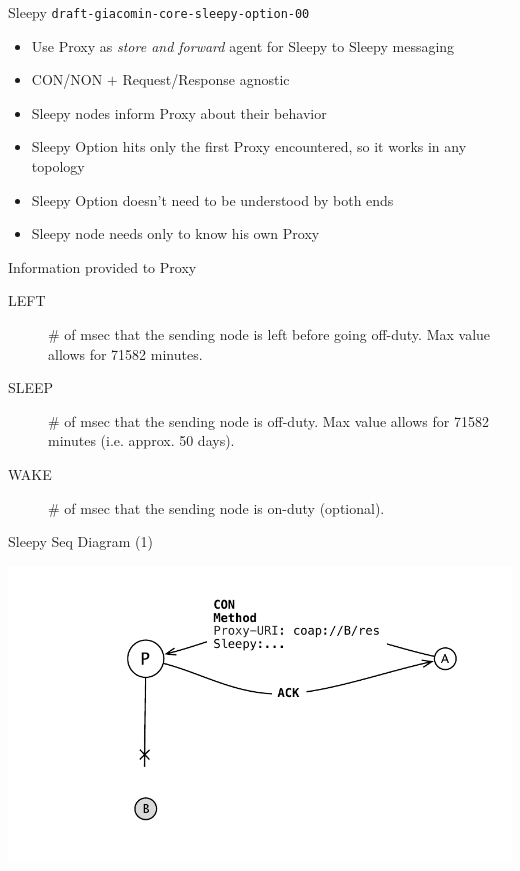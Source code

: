 \documentclass{beamer}
\begin{document}
\begin{frame}{Sleepy  \hspace{6cm} {\tiny \texttt{draft-giacomin-core-sleepy-option-00}}}

\begin{itemize}
 \item Use Proxy as \emph{store and forward} agent for Sleepy to Sleepy messaging
 \item CON/NON $+$ Request/Response agnostic
 \item Sleepy nodes inform Proxy about their behavior
 \item Sleepy Option hits only the first Proxy encountered, so it works in any topology
 \item Sleepy Option doesn't need to be understood by both ends
 \item Sleepy node needs only to know his own Proxy
\end{itemize}

\end{frame}

\begin{frame}[fragile]{Information provided to Proxy}

\begin{description}
 \item[LEFT] \# of msec that the sending node is left before going off-duty.  Max value allows for 71582 minutes.
 \item[SLEEP] \# of msec that the sending node is off-duty.  Max value allows for 71582 minutes (i.e. approx. 50 days).
 \item[WAKE] \# of msec that the sending node is on-duty (optional).
\end{description}
\end{frame}

\begin{frame}{Sleepy Seq Diagram (1)}
 \begin{center}
  \includegraphics[width=\textwidth]{../../share/images/sleepy1.pdf}
 \end{center}
\end{frame}
\end{document}
